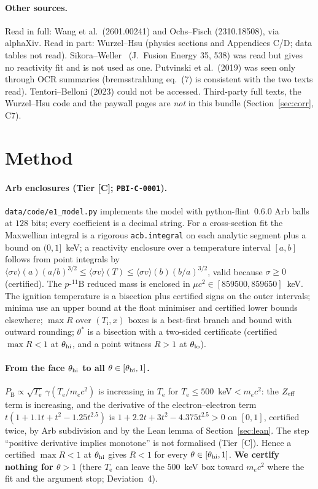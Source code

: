 \documentclass[10pt]{article}
\newcommand{\tier}[1]{\textsf{[#1]}}
\newcommand{\tC}{\tier{C}}
\newcommand{\Te}{T_{\mathrm e}}
\newcommand{\Ti}{T_{\mathrm i}}
\newcommand{\pB}{p\text{-}{}^{11}\mathrm{B}}
\newcommand{\PB}{P_{\mathrm B}}
\begin{document}
\paragraph{Other sources.} Read in full: Wang et al.\ (2601.00241) and Ochs--Fisch (2310.18508), via alphaXiv. Read in part: Wurzel--Hsu (physics sections and Appendices C/D; data tables not read). Sikora--Weller~\cite{sw} (J.\ Fusion Energy 35, 538) was read but gives no reactivity fit and is not used as one. Putvinski et al.\ (2019) was seen only through OCR summaries (bremsstrahlung eq.~(7) is consistent with the two texts read). Tentori--Belloni (2023) could not be accessed. Third-party full texts, the Wurzel--Hsu code and the paywall pages are \emph{not} in this bundle (Section~\ref{sec:corr}, C7).

\section{Method}\label{sec:method}
\paragraph{Arb enclosures (Tier \tC{}; \texttt{PBI-C-0001}).} \texttt{data/code/e1\_model.py} implements the model with python-flint~0.6.0 Arb balls at $128$ bits; every coefficient is a decimal string. For a cross-section fit the Maxwellian integral is a rigorous \texttt{acb.integral} on each analytic segment plus a bound on $(0,1]$~keV; a reactivity enclosure over a temperature interval $[a,b]$ follows from point integrals by $\langle\sigma v\rangle(a)(a/b)^{3/2}\le\langle\sigma v\rangle(T)\le\langle\sigma v\rangle(b)(b/a)^{3/2}$, valid because $\sigma\ge0$ (certified). The $\pB$ reduced mass is enclosed in $\mu c^2\in[859500,859650]$~keV. The ignition temperature is a bisection plus certified signs on the outer intervals; minima use an upper bound at the float minimiser and certified lower bounds elsewhere; $\max R$ over $(\Ti,x)$ boxes is a best-first branch and bound with outward rounding; $\theta^\ast$ is a bisection with a two-sided certificate (certified $\max R<1$ at $\theta_{\rm hi}$, and a point witness $R>1$ at $\theta_{\rm lo}$).
\paragraph{From the face $\theta_{\rm hi}$ to all $\theta\in[\theta_{\rm hi},1]$.} $\PB\propto\sqrt{\Te}\,\gamma(\Te/m_ec^2)$ is increasing in $\Te$ for $\Te\le500$~keV$<m_ec^2$: the $Z_{\rm eff}$ term is increasing, and the derivative of the electron--electron term $t(1+1.1t+t^2-1.25t^{2.5})$ is $1+2.2t+3t^2-4.375t^{2.5}>0$ on $[0,1]$, certified twice, by Arb subdivision and by the Lean lemma of Section~\ref{sec:lean}. The step ``positive derivative implies monotone'' is not formalised (Tier~\tC{}). Hence a certified $\max R<1$ at $\theta_{\rm hi}$ gives $R<1$ for every $\theta\in[\theta_{\rm hi},1]$. \textbf{We certify nothing for $\theta>1$} (there $\Te$ can leave the $500$~keV box toward $m_ec^2$ where the fit and the argument stop; Deviation~4).
\end{document}
